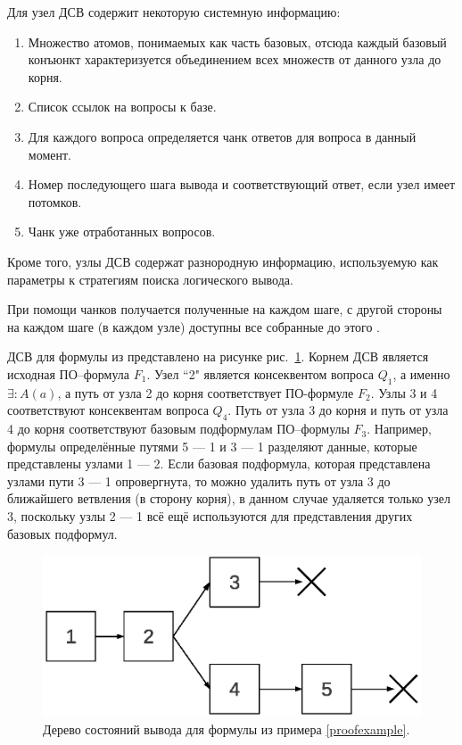Для  узел ДСВ содержит некоторую системную информацию:
\begin{enumerate}
\item Множество атомов, понимаемых как часть базовых, отсюда каждый базовый конъюнкт характеризуется объединением всех множеств от данного узла до корня.
\item Список ссылок на вопросы к базе.
\item Для каждого вопроса определяется чанк ответов для вопроса в данный момент.
\item Номер последующего шага вывода и соответствующий ответ, если узел имеет потомков.
\item Чанк уже отработанных вопросов.
\end{enumerate}
Кроме того, узлы ДСВ содержат разнородную информацию, используемую как параметры к стратегиям поиска логического вывода.

При помощи чанков получается   полученные на каждом шаге, с другой стороны на каждом шаге (в каждом узле) доступны все собранные до этого .

ДСВ для формулы из  представлено на рисунке рис.~\ref{fig:pst}. Корнем ДСВ является исходная ПО--формула $F_1$. Узел ``2" является консеквентом вопроса $Q_1$, а именно $\exists\colon A(a)$, а путь от узла 2 до корня соответствует ПО-формуле $F_2$. Узлы 3 и 4 соответствуют консеквентам вопроса $Q_4$. Путь от узла 3 до корня и путь от узла 4 до корня соответствуют базовым подформулам ПО--формулы $F_3$. Например, формулы определённые путями 5 --- 1 и 3 --- 1 разделяют данные, которые представлены узлами 1 --- 2. Если базовая подформула, которая представлена узлами пути 3 --- 1 опровергнута, то можно удалить путь от узла 3 до ближайшего ветвления (в сторону корня), в данном случае удаляется только узел 3, поскольку узлы 2 --- 1 всё ещё используются для представления других базовых подформул.

\begin{figure}[h]
	\centering
	\includegraphics[width=0.4\linewidth]{pics/PST.eps}
	\caption{Дерево состояний вывода для формулы из примера \ref{proofexample}.}
	\label{fig:pst}
\end{figure}

